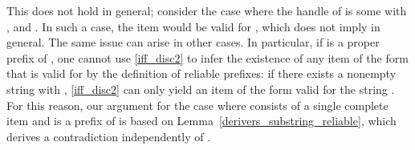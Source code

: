 \begin{isabellebody}
\begin{isamarkuptext}
This does not hold in general; consider the case where the handle of 
is some \isa{{\isasymdelta}} with \isa{\isafree{{\isasymalpha}}\ {\isacharequal}{\kern0pt}\ \isafree{{\isasymgamma}}\ {\isacharat}{\kern0pt}\ \isafree{{\isasymdelta}}}, and . In such a case, the item 
 would be valid for \isa{{\isasymalpha}}, which does not imply
 in general. The same issue can arise in other cases. In
particular, if \isa{\isafree{{\isasymalpha}}\ {\isacharat}{\kern0pt}\ \isafree{{\isasymbeta}}} is a proper prefix of \isa{{\isasymgamma}}, one cannot use \eqref{iff_disc2} to infer
the existence of any item of the form  that is valid for \isa{{\isasymalpha}\ {\isacharat}{\kern0pt}\ {\isasymbeta}} by the
definition of reliable prefixes: if there exists a nonempty string \isa{{\isasymtheta}} with \isa{\isafree{{\isasymgamma}}\ {\isacharequal}{\kern0pt}\ \isafree{{\isasymalpha}}\ {\isacharat}{\kern0pt}\ \isafree{{\isasymbeta}}\ {\isacharat}{\kern0pt}\ \isafree{{\isasymtheta}}},
\eqref{iff_disc2} can only yield an item of the form  valid for
the string \isa{\isafree{{\isasymalpha}}\ {\isacharat}{\kern0pt}\ \isafree{{\isasymbeta}}\ {\isacharat}{\kern0pt}\ \isafree{{\isasymtheta}}\ {\isacharat}{\kern0pt}\ \isafree{{\isasymzeta}}}. For this reason, our argument for the case where 
 consists of a single complete item and \isa{\isafree{{\isasymalpha}}\ {\isacharat}{\kern0pt}\ \isafree{{\isasymbeta}}} is a prefix of \isa{{\isasymgamma}} is based on
Lemma~\ref{derivers_substring_reliable}, which derives a contradiction independently of . 


\end{isamarkuptext}
\end{isabellebody}
